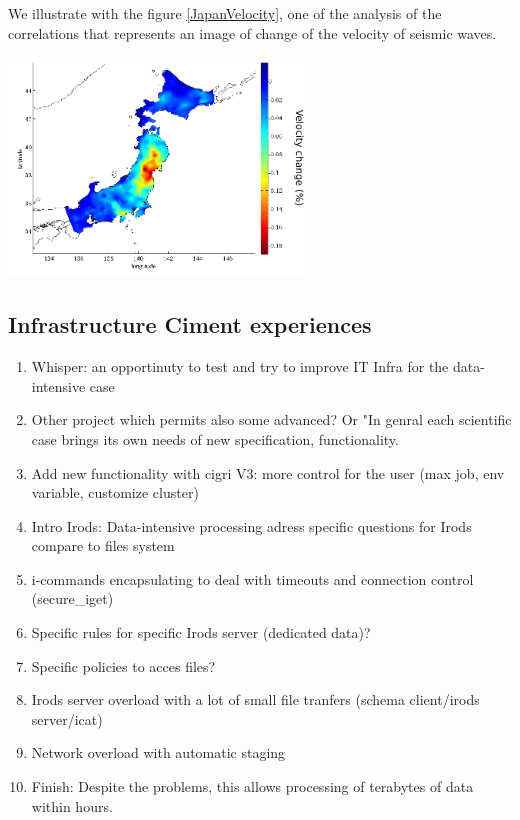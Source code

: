 \documentclass[a4paper, 10pt]{article}
\begin{document}
\begin{multicols}{2}
We illustrate with the figure \ref{JapanVelocity}, one of the analysis of the correlations that represents an image
of change of the velocity of seismic waves.
\begin{center}%
\centering
{}
\includegraphics[width=8cm]{JapanVelocity.png}
\end{center}


\subsection{Infrastructure Ciment experiences}

	\begin{enumerate}
  	  \item Whisper: an opportinuty to test and try to improve IT Infra for the data-intensive case
  	  \item Other project which permits also some advanced? Or "In genral each scientific case brings its own needs of new specification, functionality.
	  \item Add new functionality with cigri V3: more control for the user (max job, env variable, customize cluster)
	  \item Intro Irods: Data-intensive processing adress specific questions for Irods compare to files system
	  \item i-commands encapsulating to deal with timeouts and connection control (secure\_iget)
	  \item Specific rules for specific Irods server (dedicated data)?
	  \item Specific policies to acces files?
      \item Irods server overload with a lot of small file tranfers (schema client/irods server/icat)
      \item Network overload with automatic staging
      \item Finish: Despite the problems, this allows processing of terabytes of data within hours.
	\end{enumerate}




\end{multicols}
\end{document}

